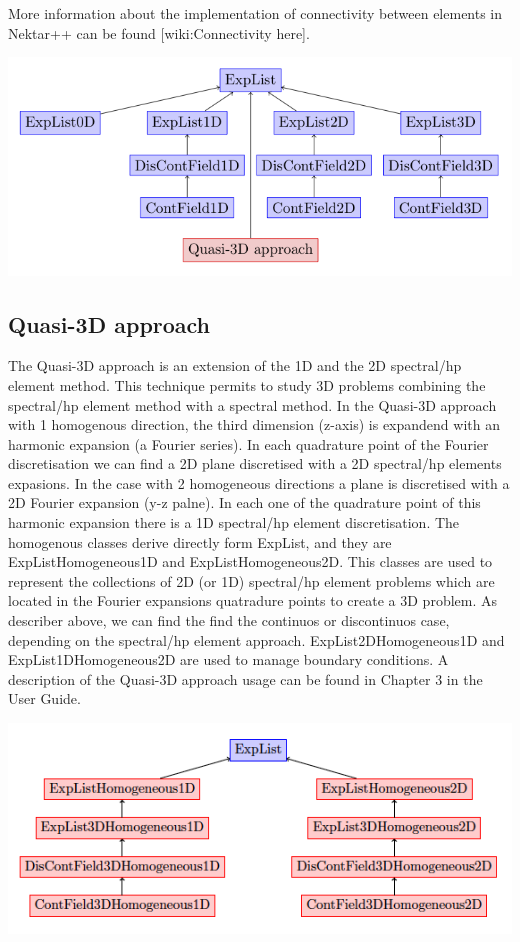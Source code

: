 More information about the implementation of connectivity between elements in
Nektar++ can be found [wiki:Connectivity here].

\begin{center}
\includegraphics{img/MultiRegions.png}
\end{center}

\subsection{Quasi-3D approach}

The Quasi-3D approach is an extension of the 1D and the 2D spectral/hp element
method. This technique permits to study 3D problems combining the spectral/hp
element method with a spectral method. In the Quasi-3D approach with 1
homogenous direction, the third dimension (z-axis) is expandend with an harmonic
expansion (a Fourier series). In each quadrature point of the Fourier
discretisation we can find a 2D plane discretised with a 2D spectral/hp elements
expasions. In the case with 2 homogeneous directions a plane is discretised with
a 2D Fourier expansion (y-z palne). In each one of the quadrature point of this
harmonic expansion there is a 1D spectral/hp element discretisation. The
homogenous classes derive directly form ExpList, and they are
ExpListHomogeneous1D and ExpListHomogeneous2D. This classes are used to
represent the collections of 2D (or 1D) spectral/hp element problems which are
located in the Fourier expansions quatradure points to create a 3D problem. As
describer above, we can find the find the continuos or discontinuos case,
depending on the spectral/hp element approach. ExpList2DHomogeneous1D and
ExpList1DHomogeneous2D are used to manage boundary conditions. A description of
the Quasi-3D approach usage can be found in Chapter 3 in the User Guide.

\begin{center}
\includegraphics[width=\textwidth]{img/Quasi3d.png}
\end{center}


